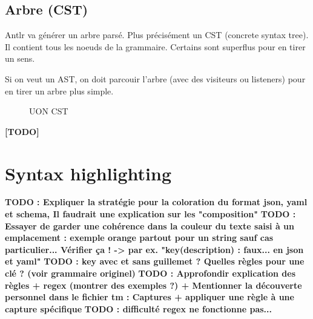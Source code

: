 \documentclass[
    iict, %
    il, %
]{heig-tb}
\begin{document}
\subsection{Arbre (CST)}
Antlr va générer un arbre parsé. Plus précisément un CST (concrete syntax tree).
Il contient tous les noeuds de la grammaire. Certains sont superflus pour en tirer un sens.

Si on veut un AST, on doit parcouir l'arbre (avec des visiteurs ou listeners) pour en tirer un arbre plus simple.

\begin{figure}[!h]
    \begin{center}
    \end{center}
    \caption[UON CST]{\label{uon-tree} UON CST}
\end{figure}

\textbf{[TODO]}

\section{Syntax highlighting}

\textbf{TODO : Expliquer la stratégie pour la coloration du format json, yaml et schema, Il faudrait une explication sur les "composition"  }
\textbf{TODO : Essayer de garder une cohérence dans la couleur du texte saisi à un emplacement : exemple orange partout pour un string sauf cas particulier...
    Vérifier ça ! -> par ex. "key(description) : faux... en json et yaml"}
\textbf{TODO : key avec et sans guillemet ? Quelles règles pour une clé ? (voir grammaire originel)}
\textbf{TODO : Approfondir explication des règles + regex (montrer des exemples ?) + Mentionner la découverte personnel dans le fichier tm : Captures + appliquer une règle à une capture spécifique}
\textbf{TODO : difficulté regex ne fonctionne pas...}
\end{document}
